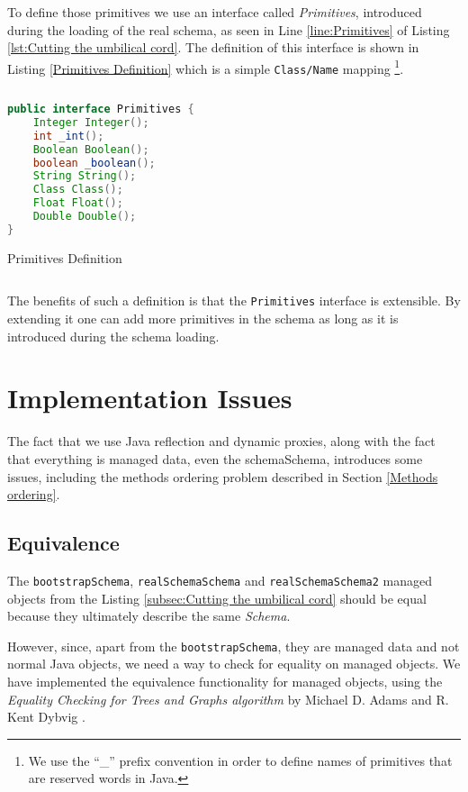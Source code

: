 To define those primitives we use an interface called \textit{Primitives}, introduced during the loading of the real schema, as seen in Line \ref{line:Primitives} of Listing \ref{lst:Cutting the umbilical cord}.
The definition of this interface is shown in Listing \ref{Primitives Definition} which is a simple \texttt{Class/Name} mapping \footnote{We use the ``\_'' prefix convention in order to define names of primitives that are reserved words in Java.}. 

\begin{sourcecode} [H]
	\begin{lstlisting}[language=Java, escapechar=|]
public interface Primitives {
	Integer Integer();
	int _int();
	Boolean Boolean();
	boolean _boolean();
	String String();
	Class Class();
	Float Float();
	Double Double();
}
	\end{lstlisting}
	\caption{Primitives Definition}
	\label{lst:Primitives Definition}
\end{sourcecode}

The benefits of such a definition is that the \texttt{Primitives} interface is extensible.
By extending it one can add more primitives in the schema as long as it is introduced during the schema loading.

\section{Implementation Issues}\label{Implementation Issues}
The fact that we use Java reflection and dynamic proxies, along with the fact that everything is managed data, even the schemaSchema, introduces some issues, including the methods ordering problem described in Section \ref{Methods ordering}.

\subsection{Equivalence}\label{Managed Object equivalence}
The \texttt{bootstrapSchema}, \texttt{realSchemaSchema} and \texttt{realSchemaSchema2} managed objects from the Listing \ref{subsec:Cutting the umbilical cord} should be equal because they ultimately describe the same \textit{Schema}.

However, since, apart from the \texttt{bootstrapSchema}, they are managed data and not normal Java objects, we need a way to check for equality on managed objects.
We have implemented the equivalence functionality for managed objects, using the \textit{Equality Checking for Trees and Graphs
algorithm} by Michael D. Adams and R. Kent Dybvig \cite{adams2008efficient}.

